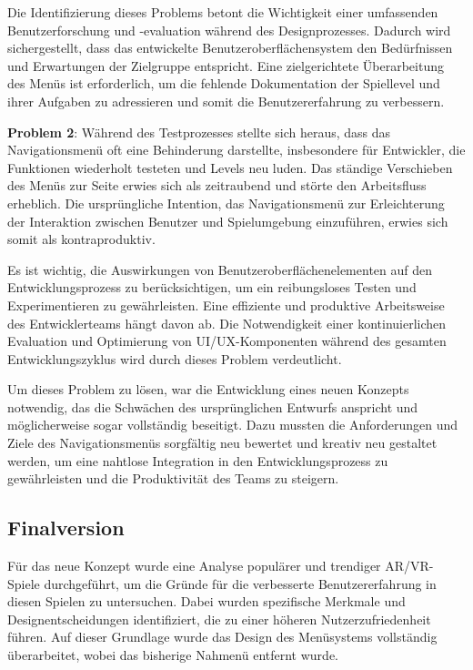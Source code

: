 Die Identifizierung dieses Problems betont die Wichtigkeit einer umfassenden Benutzerforschung und -evaluation während
des Designprozesses. Dadurch wird sichergestellt, dass das entwickelte Benutzeroberflächensystem den Bedürfnissen und
Erwartungen der Zielgruppe entspricht. Eine zielgerichtete Überarbeitung des Menüs ist erforderlich, um die fehlende
Dokumentation der Spiellevel und ihrer Aufgaben zu adressieren und somit die Benutzererfahrung zu verbessern.

\textbf{Problem 2}: Während des Testprozesses stellte sich heraus, dass das Navigationsmenü oft eine Behinderung darstellte,
insbesondere für Entwickler, die Funktionen wiederholt testeten und Levels neu luden. Das ständige Verschieben des Menüs
zur Seite erwies sich als zeitraubend und störte den Arbeitsfluss erheblich. Die ursprüngliche Intention, das
Navigationsmenü zur Erleichterung der Interaktion zwischen Benutzer und Spielumgebung einzuführen, erwies sich somit als
kontraproduktiv.

Es ist wichtig, die Auswirkungen von Benutzeroberflächenelementen auf den Entwicklungsprozess zu berücksichtigen, um ein
reibungsloses Testen und Experimentieren zu gewährleisten. Eine effiziente und produktive Arbeitsweise des Entwicklerteams
hängt davon ab. Die Notwendigkeit einer kontinuierlichen Evaluation und Optimierung von UI/UX-Komponenten während des gesamten
Entwicklungszyklus wird durch dieses Problem verdeutlicht.

Um dieses Problem zu lösen, war die Entwicklung eines neuen Konzepts notwendig, das die Schwächen des ursprünglichen
Entwurfs anspricht und möglicherweise sogar vollständig beseitigt. Dazu mussten die Anforderungen und Ziele des Navigationsmenüs
sorgfältig neu bewertet und kreativ neu gestaltet werden, um eine nahtlose Integration in den Entwicklungsprozess zu gewährleisten
und die Produktivität des Teams zu steigern.

\subsection{Finalversion} %
Für das neue Konzept wurde eine Analyse populärer und trendiger AR/VR-Spiele durchgeführt, um die Gründe für die verbesserte
Benutzererfahrung in diesen Spielen zu untersuchen. Dabei wurden spezifische Merkmale und Designentscheidungen identifiziert,
die zu einer höheren Nutzerzufriedenheit führen. Auf dieser Grundlage wurde das Design des Menüsystems vollständig überarbeitet,
wobei das bisherige Nahmenü entfernt wurde.

